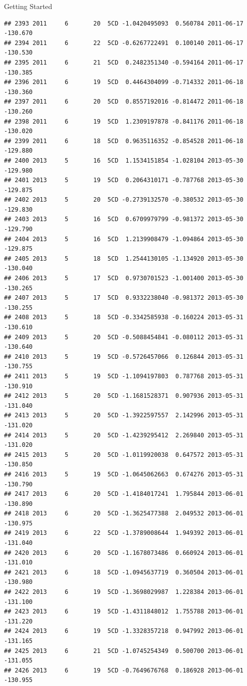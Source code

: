 \documentclass[
  ignorenonframetext,
]{beamer}
\begin{document}
\begin{frame}[fragile]{Getting Started}
\begin{verbatim}
## 2393 2011     6       20  5CD -1.0420495093  0.560784 2011-06-17 -130.670
## 2394 2011     6       22  5CD -0.6267722491  0.100140 2011-06-17 -130.530
## 2395 2011     6       21  5CD  0.2482351340 -0.594164 2011-06-17 -130.385
## 2396 2011     6       19  5CD  0.4464304099 -0.714332 2011-06-18 -130.360
## 2397 2011     6       20  5CD  0.8557192016 -0.814472 2011-06-18 -130.260
## 2398 2011     6       19  5CD  1.2309197878 -0.841176 2011-06-18 -130.020
## 2399 2011     6       18  5CD  0.9635116352 -0.854528 2011-06-18 -129.880
## 2400 2013     5       16  5CD  1.1534151854 -1.028104 2013-05-30 -129.980
## 2401 2013     5       19  5CD  0.2064310171 -0.787768 2013-05-30 -129.875
## 2402 2013     5       20  5CD -0.2739132570 -0.380532 2013-05-30 -129.830
## 2403 2013     5       16  5CD  0.6709979799 -0.981372 2013-05-30 -129.790
## 2404 2013     5       16  5CD  1.2139908479 -1.094864 2013-05-30 -129.875
## 2405 2013     5       18  5CD  1.2544130105 -1.134920 2013-05-30 -130.040
## 2406 2013     5       17  5CD  0.9730701523 -1.001400 2013-05-30 -130.265
## 2407 2013     5       17  5CD  0.9332238040 -0.981372 2013-05-30 -130.255
## 2408 2013     5       18  5CD -0.3342585938 -0.160224 2013-05-31 -130.610
## 2409 2013     5       20  5CD -0.5088454841 -0.080112 2013-05-31 -130.640
## 2410 2013     5       19  5CD -0.5726457066  0.126844 2013-05-31 -130.755
## 2411 2013     5       19  5CD -1.1094197803  0.787768 2013-05-31 -130.910
## 2412 2013     5       20  5CD -1.1681528371  0.907936 2013-05-31 -131.040
## 2413 2013     5       20  5CD -1.3922597557  2.142996 2013-05-31 -131.020
## 2414 2013     5       20  5CD -1.4239295412  2.269840 2013-05-31 -131.020
## 2415 2013     5       20  5CD -1.0119920038  0.647572 2013-05-31 -130.850
## 2416 2013     5       19  5CD -1.0645062663  0.674276 2013-05-31 -130.790
## 2417 2013     6       20  5CD -1.4184017241  1.795844 2013-06-01 -130.890
## 2418 2013     6       20  5CD -1.3625477388  2.049532 2013-06-01 -130.975
## 2419 2013     6       22  5CD -1.3789008644  1.949392 2013-06-01 -131.040
## 2420 2013     6       20  5CD -1.1678073486  0.660924 2013-06-01 -131.010
## 2421 2013     6       18  5CD -1.0945637719  0.360504 2013-06-01 -130.980
## 2422 2013     6       19  5CD -1.3698029987  1.228384 2013-06-01 -131.100
## 2423 2013     6       19  5CD -1.4311848012  1.755788 2013-06-01 -131.220
## 2424 2013     6       19  5CD -1.3328357218  0.947992 2013-06-01 -131.165
## 2425 2013     6       21  5CD -1.0745254349  0.500700 2013-06-01 -131.055
## 2426 2013     6       19  5CD -0.7649676768  0.186928 2013-06-01 -130.955

\end{verbatim}
\end{frame}
\end{document}
